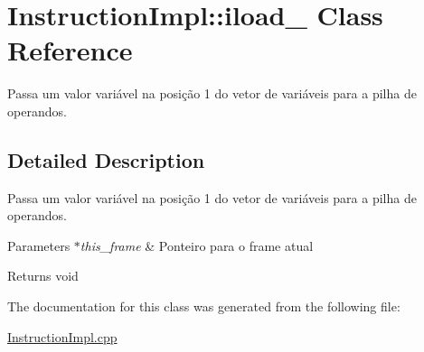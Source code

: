 \hypertarget{class_instruction_impl_1_1iload__1}{}\section{Instruction\+Impl\+:\+:iload\+\_ Class Reference}
\label{class_instruction_impl_1_1iload__1}


Passa um valor variável na posição 1 do vetor de variáveis para a pilha de operandos.  




\subsection{Detailed Description}
Passa um valor variável na posição 1 do vetor de variáveis para a pilha de operandos. 


\begin{DoxyParams}{Parameters}
{\em $\ast$this\+\_\+frame} & Ponteiro para o frame atual \\
\hline
\end{DoxyParams}
\begin{DoxyReturn}{Returns}
void 
\end{DoxyReturn}


The documentation for this class was generated from the following file\+:\begin{DoxyCompactItemize}
\item 
\hyperlink{_instruction_impl_8cpp}{Instruction\+Impl.\+cpp}\end{DoxyCompactItemize}
